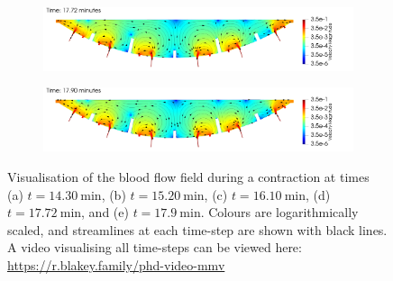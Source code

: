 \begin{figure}
\begin{subfigure}{\textwidth}
                    \caption{}
                    \label{fig:moving-mesh-placenta-velocity:3}
                \end{subfigure}
                \begin{subfigure}{\textwidth}
                    \includegraphics[width=\textwidth]{diagrams/results-contractions/placenta-moving-mesh/mm-placenta-velocity.0095.png}
                    \caption{}
                    \label{fig:moving-mesh-placenta-velocity:4}
                \end{subfigure}
                \begin{subfigure}{\textwidth}
                    \includegraphics[width=\textwidth]{diagrams/results-contractions/placenta-moving-mesh/mm-placenta-velocity.0100.png}
                    \caption{}
                    \label{fig:moving-mesh-placenta-velocity:5}
                \end{subfigure}
                \caption{Visualisation of the blood flow field during a contraction at times (a) $t=\qty{14.30}{\minute}$, (b) $t=\qty{15.20}{\minute}$, (c) $t=\qty{16.10}{\minute}$, (d) $t=\qty{17.72}{\minute}$, and (e) $t=\qty{17.9}{\minute}$. Colours are logarithmically scaled, and streamlines at each time-step are shown with black lines. A video visualising all time-steps can be viewed here: \url{https://r.blakey.family/phd-video-mmv}}
                \label{fig:moving-mesh-placenta-velocity}
            \end{figure}

